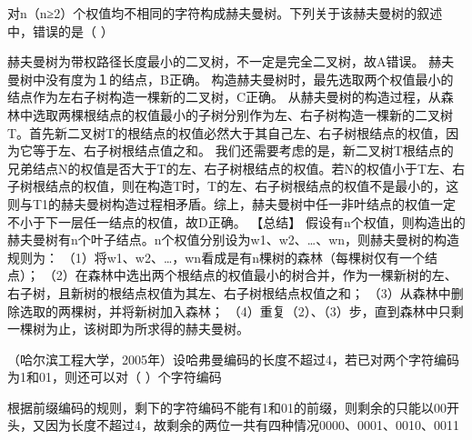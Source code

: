 \question 对n（n≥2）个权值均不相同的字符构成赫夫曼树。下列关于该赫夫曼树的叙述中，错误的是（
）
\par{}
\begin{solution}赫夫曼树为带权路径长度最小的二叉树，不一定是完全二叉树，故A错误。
赫夫曼树中没有度为１的结点，B正确。
构造赫夫曼树时，最先选取两个权值最小的结点作为左右子树构造一棵新的二叉树，C正确。
从赫夫曼树的构造过程，从森林中选取两棵根结点的权值最小的子树分别作为左、右子树构造一棵新的二叉树T。首先新二叉树T的根结点的权值必然大于其自己左、右子树根结点的权值，因为它等于左、右子树根结点值之和。
我们还需要考虑的是，新二叉树T根结点的兄弟结点N的权值是否大于T的左、右子树根结点的权值。若N的权值小于T左、右子树根结点的权值，则在构造T时，T的左、右子树根结点的权值不是最小的，这则与T1的赫夫曼树构造过程相矛盾。综上，赫夫曼树中任一非叶结点的权值一定不小于下一层任一结点的权值，故D正确。
【总结】
假设有n个权值，则构造出的赫夫曼树有n个叶子结点。n个权值分别设为w1、w2、\ldots{}、wn，则赫夫曼树的构造规则为：
（1）将w1、w2、\ldots{}，wn看成是有n棵树的森林（每棵树仅有一个结点）；
（2）在森林中选出两个根结点的权值最小的树合并，作为一棵新树的左、右子树，且新树的根结点权值为其左、右子树根结点权值之和；
（3）从森林中删除选取的两棵树，并将新树加入森林；
（4）重复（2）、（3）步，直到森林中只剩一棵树为止，该树即为所求得的赫夫曼树。
\end{solution}
\question （哈尔滨工程大学，2005年）设哈弗曼编码的长度不超过4，若已对两个字符编码为1和01，则还可以对（
）个字符编码
\par{}
\begin{solution}根据前缀编码的规则，剩下的字符编码不能有1和01的前缀，则剩余的只能以00开头，又因为长度不超过4，故剩余的两位一共有四种情况0000、0001、0010、0011
\end{solution}
